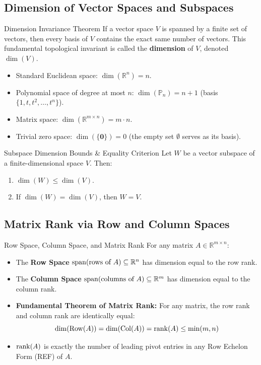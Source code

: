 \subsection{Dimension of Vector Spaces and Subspaces}

\begin{theorembox}{Dimension Invariance Theorem}
If a vector space $V$ is spanned by a finite set of vectors, then every basis of $V$ contains the exact same number of vectors. This fundamental topological invariant is called the \textbf{dimension} of $V$, denoted $\dim(V)$.
\begin{itemize}
    \item Standard Euclidean space: $\dim(\mathbb{R}^n) = n$.
    \item Polynomial space of degree at most $n$: $\dim(\mathbb{P}_n) = n + 1$ (basis $\{1, t, t^2, \dots, t^n\}$).
    \item Matrix space: $\dim(\mathbb{R}^{m \times n}) = m \cdot n$.
    \item Trivial zero space: $\dim(\{\mathbf{0}\}) = 0$ (the empty set $\emptyset$ serves as its basis).
\end{itemize}
\end{theorembox}

\begin{theorembox}{Subspace Dimension Bounds \& Equality Criterion}
Let $W$ be a vector subspace of a finite-dimensional space $V$. Then:
\begin{enumerate}
    \item $\dim(W) \le \dim(V)$.
    \item If $\dim(W) = \dim(V)$, then $W = V$.
\end{enumerate}
\end{theorembox}

\subsection{Matrix Rank via Row and Column Spaces}

\begin{definitionbox}{Row Space, Column Space, and Matrix Rank}
For any matrix $A \in \mathbb{R}^{m \times n}$:
\begin{itemize}
    \item The \textbf{Row Space} $\operatorname{span}(\text{rows of } A) \subseteq \mathbb{R}^n$ has dimension equal to the row rank.
    \item The \textbf{Column Space} $\operatorname{span}(\text{columns of } A) \subseteq \mathbb{R}^m$ has dimension equal to the column rank.
    \item \textbf{Fundamental Theorem of Matrix Rank:} For any matrix, the row rank and column rank are identically equal:
    \begin{equation}
    \dim(\operatorname{Row}(A)) = \dim(\operatorname{Col}(A)) = \operatorname{rank}(A) \le \min(m, n)
    \end{equation}
    \item $\operatorname{rank}(A)$ is exactly the number of leading pivot entries in any Row Echelon Form (REF) of $A$.
\end{itemize}
\end{definitionbox}

